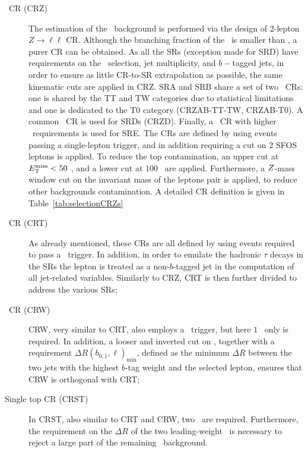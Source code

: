 			\begin{description}

				\item [\Zjets\ CR (CRZ)] The estimation of the \Znunu\ background is performed via the design of $2$-lepton $Z \rightarrow \ell \ell$ \ac{CR}. Although the branching fraction of the \Zll\ is smaller than \Znunu, a purer \ac{CR} can be obtained. As all the \acp{SR} (exception made for SRD) have requirements on the \MET\ selection, jet multiplicity, and $b-$tagged jets, in order to ensure as little \ac{CR}-to-\ac{SR} extrapolation as possible, the same kinematic cuts are applied in CRZ. SRA and SRB share a set of two \Zboson\ \acp{CR}: one is shared by the TT and TW categories due to statistical limitations and one is dedicated to the T0 category (CRZAB-TT-TW, CRZAB-T0). A common \Zboson\ \ac{CR} is used for SRDs (CRZD). Finally, a \Zboson\ \ac{CR} with higher \HT\ requirements is used for SRE. The \acp{CR} are defined by using events passing a single-lepton trigger, and in addition requiring a cut on $2$ \ac{SFOS} leptons is applied. To reduce the top contamination, an upper cut at $E_{\mathrm{T}}^{\mathrm{miss}} < 50$ \GeV, and a lower cut at $100$ \GeV\ are applied. Furthermore, a $Z$-mass window cut on the invariant mass of the leptons pair is applied, to reduce other backgrounds contamination. A detailed \ac{CR} definition is given in Table~\ref{tab:selectionCRZs}

		
				\item [\ttbar\ CR (CRT)] As already mentioned, these \acp{CR} are all defined by using events required to pass a \met\ trigger. In addition, in order to emulate the hadronic $\tau$ decays in the \acp{SR} the lepton is treated as a non-$b$-tagged jet in the computation of all jet-related variables. Similarly to CRZ, CRT is then further divided to address the various \acp{SR};

				\item [\Wjets\ CR (CRW)] CRW, very similar to CRT, also employs a \met\ trigger, but here $1$ \bj\ only is required. In addition, a looser and inverted cut on \mantikttwelvezero, together with a requirement $\Delta R(b_{0,1},\ell)_{\mathrm{min}}$, defined as the minimum $\Delta R$ between the two jets with the highest $b$-tag weight and the selected lepton, ensures that CRW is orthogonal with CRT; 

				\item [Single top CR (CRST)] In CRST, also similar to CRT and CRW, two \bjs\ are required. Furthermore, the requirement on the $\Delta R$ of the two leading-weight \bjs\ is necessary to reject a large part of the remaining \ttbar\ background. 
			\end{description}

